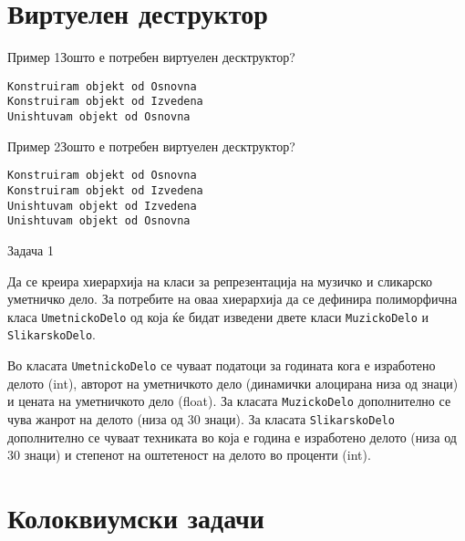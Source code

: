 \section{Виртуелен деструктор}

\begin{frame}[fragile]{Пример 1}{Зошто е потребен виртуелен десктруктор?}

\begin{tiny}
\begin{verbatim}
Konstruiram objekt od Osnovna
Konstruiram objekt od Izvedena
Unishtuvam objekt od Osnovna
\end{verbatim}
\end{tiny}
\end{frame}

\begin{frame}[fragile]{Пример 2}{Зошто е потребен виртуелен десктруктор?}

\begin{tiny}
\begin{verbatim}
Konstruiram objekt od Osnovna
Konstruiram objekt od Izvedena
Unishtuvam objekt od Izvedena
Unishtuvam objekt od Osnovna
\end{verbatim}
\end{tiny}
\end{frame}

\begin{frame}{Задача 1}
\begin{scriptsize}
Да се креира хиерархија на класи за репрезентација на музичко и сликарско
уметничко дело. За потребите на оваа хиерархија да се дефинира полиморфична
класа \texttt{UmetnickoDelo} од која ќе бидат изведени двете класи
\texttt{MuzickoDelo} и \texttt{SlikarskoDelo}. 

Во класата \texttt{UmetnickoDelo} се чуваат податоци за годината кога е
изработено делото (int), авторот на уметничкото дело (динамички алоцирана низа
од знаци) и цената на уметничкото дело (float). За класата \texttt{MuzickoDelo}
дополнително се чува жанрот на делото (низа од 30 знаци). За класата
\texttt{SlikarskoDelo} дополнително се чуваат техниката во која е година е
изработено делото (низа од 30 знаци) и степенот на оштетеност на делото во
проценти (int).
\end{scriptsize}
\end{frame}

\section{Колоквиумски задачи}

